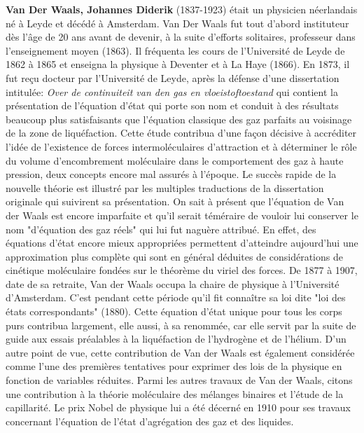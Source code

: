 \textbf{Van Der Waals, Johannes Diderik} (1837-1923) était un physicien néerlandais né à Leyde et décédé à Amsterdam. Van Der Waals fut tout d'abord instituteur dès l'âge de 20 ans avant de devenir, à la suite d'efforts solitaires, professeur dans l'enseignement moyen (1863). Il fréquenta les cours de l'Université de Leyde de 1862 à 1865 et enseigna la physique à Deventer et à La Haye (1866). En 1873, il fut reçu docteur par l'Université de Leyde, après la défense d'une dissertation intitulée: \textit{Over de continuiteit van den gas en vloeistoftoestand} qui contient la présentation de l'équation d'état qui porte son nom et conduit à des résultats beaucoup plus satisfaisants que l'équation classique des gaz parfaits au voisinage de la zone de liquéfaction. Cette étude contribua d'une façon décisive à accréditer l'idée de l'existence de forces intermoléculaires d'attraction et à déterminer le rôle du volume d'encombrement moléculaire dans le comportement des gaz à haute pression, deux concepts encore mal assurés à l'époque. Le succès rapide de la nouvelle théorie est illustré par les multiples traductions de la dissertation originale qui suivirent sa présentation. On sait à présent que l'équation de Van der Waals est encore imparfaite et qu'il serait téméraire de vouloir lui conserver le nom "d'équation des gaz réels" qui lui fut naguère attribué. En effet, des équations d'état encore mieux appropriées permettent d'atteindre aujourd'hui une approximation plus complète qui sont en général déduites de considérations de cinétique moléculaire fondées sur le théorème du viriel des forces. De 1877 à 1907, date de sa retraite, Van der Waals occupa la chaire de physique à l'Université d'Amsterdam. C'est pendant cette période qu'il fit connaître sa loi dite "loi des états correspondants" (1880). Cette équation d'état unique pour tous les corps purs contribua largement, elle aussi, à sa renommée, car elle servit par la suite de guide aux essais préalables à la liquéfaction de l'hydrogène et de l'hélium. D'un autre point de vue, cette contribution de Van der Waals est également considérée comme l'une des premières tentatives pour exprimer des lois de la physique en fonction de variables réduites. Parmi les autres travaux de Van der Waals, citons une contribution à la théorie moléculaire des mélanges binaires et l'étude de la capillarité. Le prix Nobel de physique lui a été décerné en 1910 pour ses travaux concernant l'équation de l'état d'agrégation des gaz et des liquides.

